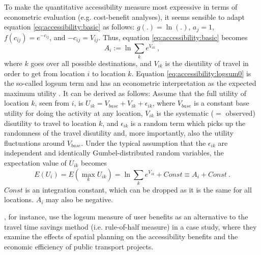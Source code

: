 To make the quantitative accessibility measure most expressive in terms of econometric evaluation (e.g. cost-benefit 
analyses), it seems sensible to adapt equation \ref{eq:accessibility:basic} as 
follows: $g(.) = \ln(.)$, $a_j = 1$, $f(c_{ij}) = e^{-c_{ij}}$, and $-c_{ij} = V_{ij}$. Thus, 
equation \ref{eq:accessibility:basic} becomes
\begin{equation}
	A_i := \ln \sum_k e^{V_{ik}} \ ,
	\label{eq:accessibility:logsum0}
\end{equation}
where $k$ goes over all possible destinations, and $V_{ik}$ is the
disutility of travel in order to get from location $i$ to location
$k$. Equation \ref{eq:accessibility:logsum0} is the so-called logsum term and has an econometric interpretation 
as the expected maximum utility \citep[e.g.][]{Ben-AkivaBook}. It can be derived as follows: Assume that the full 
utility of location $k$, seen from $i$, is $U_{ik} = V_{base} + V_{ik} + \epsilon_{ik}$, where $V_{base}$ is a constant 
base utility for doing the activity at any location, $V_{ik}$ is the systematic ($=$ observed) disutility to travel to 
location $k$, and $\epsilon_{ik}$ is a random term which picks up the randomness of the travel disutility and, more 
importantly, also the utility fluctuations around $V_{base}$.  Under the typical assumption that the $\epsilon_{ik}$ 
are independent and identically Gumbel-distributed random variables, the expectation value of $U_{ik}$ becomes
\begin{equation}
	E(U_i) = E(\max_k U_{ik}) = \ln \sum_k e^{V_{ik}} + Const \equiv A_i + Const \ .
\end{equation}
$Const$ is an integration constant, which can be dropped as it is the same for all locations. $A_i$ may also be negative.

\citet{GeuersEtAl20xx}, for instance, use the logsum measure of user benefits as an alternative to the travel time 
savings method (i.e. rule-of-half measure) in a case study, where they examine the effects of spatial planning on 
the accessibility benefits and the economic efficiency of public transport projects.


